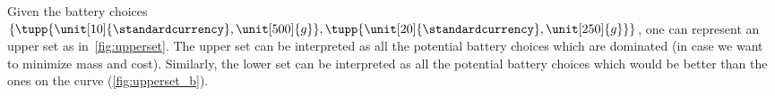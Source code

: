 Given the battery choices~$\{\tupp{\unit[10]{\standardcurrency},\unit[500]{g}},\tupp{\unit[20]{\standardcurrency},\unit[250]{g}}\}$, one can represent an upper set as in~\cref{fig:upperset}.
The upper set can be interpreted as all the potential battery choices which are dominated (in case we want to minimize mass and cost).
Similarly, the lower set can be interpreted as all the potential battery choices which would be better than the ones on the curve (\cref{fig:upperset_b}).

\begin{figure}
	\caption{}
\end{figure}
%

